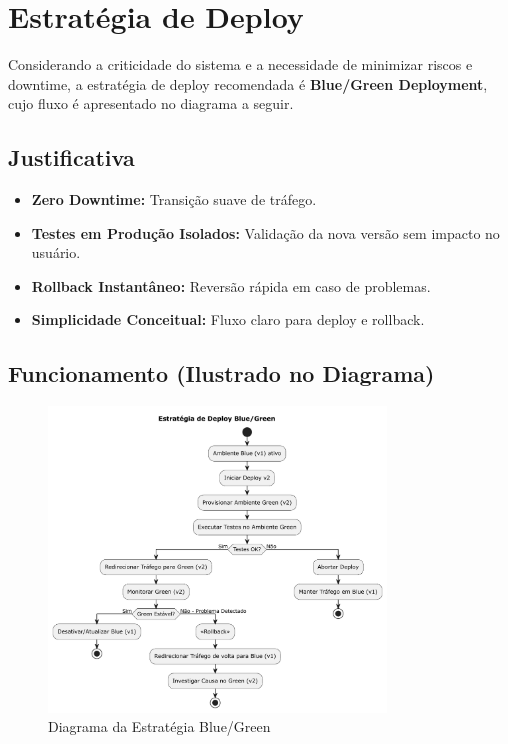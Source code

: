 \section{Estratégia de Deploy}
\label{sec:estrategia-deploy}

Considerando a criticidade do sistema e a necessidade de minimizar riscos e downtime, a estratégia de deploy recomendada é \textbf{Blue/Green Deployment}, cujo fluxo é apresentado no diagrama a seguir.

\subsection{Justificativa}
\label{subsec:deploy-justificativa}
\begin{itemize}
    \item \textbf{Zero Downtime:} Transição suave de tráfego.
    \item \textbf{Testes em Produção Isolados:} Validação da nova versão sem impacto no usuário.
    \item \textbf{Rollback Instantâneo:} Reversão rápida em caso de problemas.
    \item \textbf{Simplicidade Conceitual:} Fluxo claro para deploy e rollback.
\end{itemize}

\subsection{Funcionamento (Ilustrado no Diagrama)}
\label{subsec:deploy-funcionamento}

\begin{figure}[htbp]
    \centering
    \includegraphics[width=0.8\textwidth]{../assets/diagrama-bluegreen.pdf}
    \caption{Diagrama da Estratégia Blue/Green}
    \label{fig:diagrama-bluegreen}
\end{figure}

